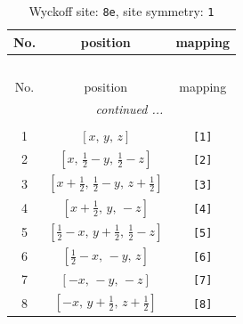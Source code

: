 \documentclass[fleqn,8pt]{jsarticle}
\begin{document}
\renewcommand{\arraystretch}{1.2}
\begin{longtable}{ccc}
\caption{Wyckoff site: {\tt 8e}, site symmetry: {\tt 1}}
 \\
 \hline \hline
No. & position & mapping \\ \hline \endfirsthead

\multicolumn{2}{l}{\tablename\ \thetable{}} \\
 \hline \hline
No. & position & mapping \\ \hline \endhead

 \hline \hline
\multicolumn{2}{r}{\footnotesize\it continued ...} \\ \endfoot

 \hline \hline
\multicolumn{2}{r}{} \\ \endlastfoot

1 & $\left[ x,\, y,\, z \right]$ & {\tt [1]} \\ \hline
2 & $\left[ x,\, \frac{1}{2} - y,\, \frac{1}{2} - z \right]$ & {\tt [2]} \\ \hline
3 & $\left[ x + \frac{1}{2},\, \frac{1}{2} - y,\, z + \frac{1}{2} \right]$ & {\tt [3]} \\ \hline
4 & $\left[ x + \frac{1}{2},\, y,\, - z \right]$ & {\tt [4]} \\ \hline
5 & $\left[ \frac{1}{2} - x,\, y + \frac{1}{2},\, \frac{1}{2} - z \right]$ & {\tt [5]} \\ \hline
6 & $\left[ \frac{1}{2} - x,\, - y,\, z \right]$ & {\tt [6]} \\ \hline
7 & $\left[ - x,\, - y,\, - z \right]$ & {\tt [7]} \\ \hline
8 & $\left[ - x,\, y + \frac{1}{2},\, z + \frac{1}{2} \right]$ & {\tt [8]} \\
\end{longtable}
\end{document}
